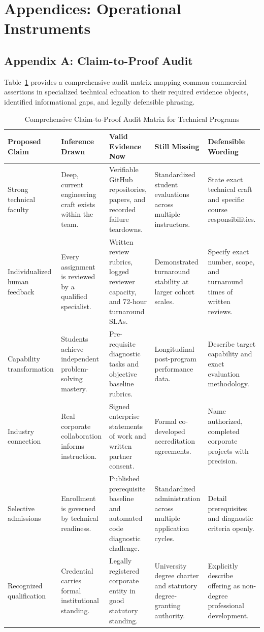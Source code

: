 \section*{Appendices: Operational Instruments}

\subsection*{Appendix A: Claim-to-Proof Audit}

Table~\ref{tab:claim_to_proof} provides a comprehensive audit matrix mapping common commercial assertions in specialized technical education to their required evidence objects, identified informational gaps, and legally defensible phrasing.

\begin{table}[t]
\centering
\small
\caption{Comprehensive Claim-to-Proof Audit Matrix for Technical Programs}
\label{tab:claim_to_proof}
\begin{tabular}{p{2.8cm}p{3.2cm}p{3.4cm}p{3.0cm}p{3.4cm}}
\toprule
\textbf{Proposed Claim} & \textbf{Inference Drawn} & \textbf{Valid Evidence Now} & \textbf{Still Missing} & \textbf{Defensible Wording} \\
\midrule
Strong technical faculty & Deep, current engineering craft exists within the team. & Verifiable GitHub repositories, papers, and recorded failure teardowns. & Standardized student evaluations across multiple instructors. & State exact technical craft and specific course responsibilities. \\
\addlinespace
Individualized human feedback & Every assignment is reviewed by a qualified specialist. & Written review rubrics, logged reviewer capacity, and 72-hour turnaround SLAs. & Demonstrated turnaround stability at larger cohort scales. & Specify exact number, scope, and turnaround times of written reviews. \\
\addlinespace
Capability transformation & Students achieve independent problem-solving mastery. & Pre-requisite diagnostic tasks and objective baseline rubrics. & Longitudinal post-program performance data. & Describe target capability and exact evaluation methodology. \\
\addlinespace
Industry connection & Real corporate collaboration informs instruction. & Signed enterprise statements of work and written partner consent. & Formal co-developed accreditation agreements. & Name authorized, completed corporate projects with precision. \\
\addlinespace
Selective admissions & Enrollment is governed by technical readiness. & Published prerequisite baseline and automated code diagnostic challenge. & Standardized administration across multiple application cycles. & Detail prerequisites and diagnostic criteria openly. \\
\addlinespace
Recognized qualification & Credential carries formal institutional standing. & Legally registered corporate entity in good statutory standing. & University degree charter and statutory degree-granting authority. & Explicitly describe offering as non-degree professional development. \\
\bottomrule
\end{tabular}
\end{table}

